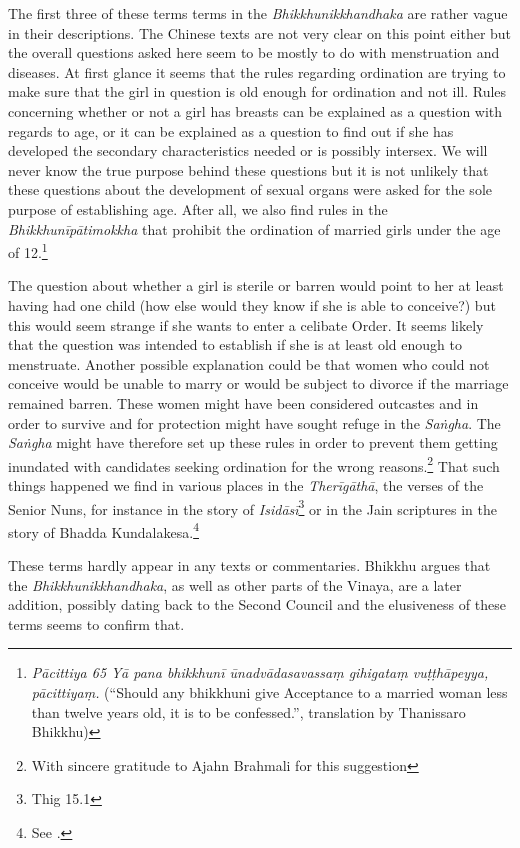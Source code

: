 The first three of these terms terms in the {\em Bhikkhunikkhandhaka} are rather vague in their descriptions. The Chinese texts are not very clear on this point either but the overall questions asked here seem to be mostly to do with menstruation and diseases. At first glance it seems that the rules regarding ordination are trying to make sure that the girl in question is old enough for ordination and not ill. Rules concerning whether or not a girl has breasts can be explained as a question with regards to age, or it can be explained as a question to find out if she has developed the secondary characteristics needed or is possibly intersex. We will never know the true purpose behind these questions but it is not unlikely that these questions about the development of sexual organs were asked for the sole purpose of establishing age. After all, we also find rules in the {\em Bhikkhunīpātimokkha} that prohibit the ordination of married girls under the age of 12.\footnote{{\em Pācittiya 65 Yā pana bhikkhunī ūnad­vāda­sa­vassaṃ gihigataṃ vuṭṭhāpeyya, pācittiyaṃ.} (``Should any bhikkhuni give Acceptance to a married woman less than twelve years old, it is to be confessed.'', translation by Thanissaro Bhikkhu)} 

The question about whether a girl is sterile or barren would point to her at least having had one child (how else would they know if she is able to conceive?) but this would seem strange if she wants to enter a celibate Order. It seems likely that the question was intended to establish if she is at least old enough to menstruate. Another possible explanation could be that women who could not conceive would be unable to marry or would be subject to divorce if the marriage remained barren. These women might have been considered outcastes and in order to survive and for protection might have sought refuge in the {\em Saṅgha}. The {\em Saṅgha} might have therefore set up these rules in order to prevent them getting inundated with candidates seeking ordination for the wrong reasons.\footnote{With sincere gratitude to Ajahn Brahmali for this suggestion} That such things happened we find in various places in the {\em Therīgāthā}, the verses of the Senior Nuns, for instance in the story of {\em Isidāsī}\footnote{Thig 15.1} or in the Jain scriptures in the story of Bhadda Kundalakesa.\footnote{See \cite{hecker}.}

These terms hardly appear in any texts or commentaries. Bhikkhu \cite{sujato2009} argues that the {\em Bhikkhunikkhandhaka}, as well as other parts of the Vinaya, are a later addition, possibly dating back to the Second Council and the elusiveness of these terms seems to confirm that. 

